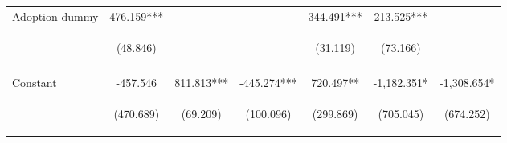 \begin{center}
\begin{tabular}{lcccccc}
Adoption dummy & 476.159*** &  &  & 344.491*** & 213.525*** &  \\
 & \begin{footnotesize}(48.846)\end{footnotesize} & \begin{footnotesize}\end{footnotesize} & \begin{footnotesize}\end{footnotesize} & \begin{footnotesize}(31.119)\end{footnotesize} & \begin{footnotesize}(73.166)\end{footnotesize} & \begin{footnotesize}\end{footnotesize} \\
\vspace{4pt} & \begin{footnotesize}[0.000]\end{footnotesize} & \begin{footnotesize}\end{footnotesize} & \begin{footnotesize}\end{footnotesize} & \begin{footnotesize}[0.000]\end{footnotesize} & \begin{footnotesize}[0.004]\end{footnotesize} & \begin{footnotesize}\end{footnotesize} \\
Constant & -457.546 & 811.813*** & -445.274*** & 720.497** & -1,182.351* & -1,308.654* \\
 & \begin{footnotesize}(470.689)\end{footnotesize} & \begin{footnotesize}(69.209)\end{footnotesize} & \begin{footnotesize}(100.096)\end{footnotesize} & \begin{footnotesize}(299.869)\end{footnotesize} & \begin{footnotesize}(705.045)\end{footnotesize} & \begin{footnotesize}(674.252)\end{footnotesize} \\

\end{tabular}
\end{center}
